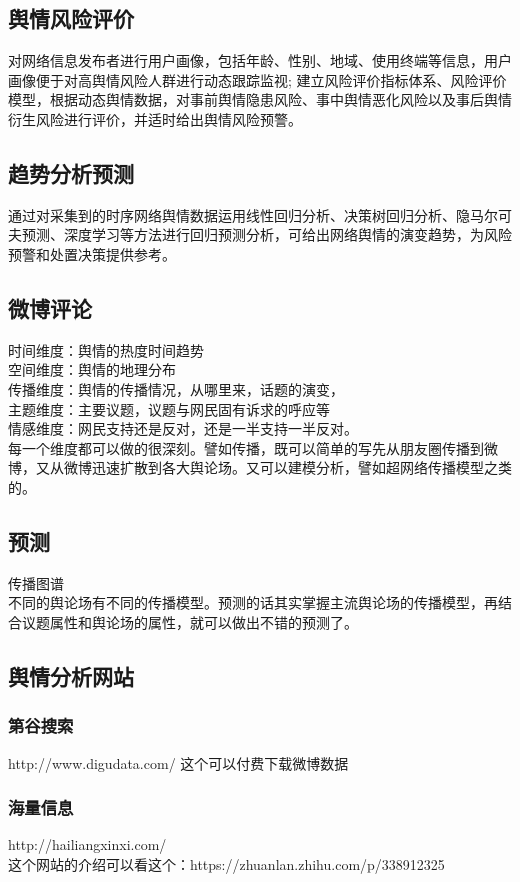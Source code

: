 \documentclass[11pt,a4paper,utf8]{article}
\begin{document}
\subsection{舆情风险评价}
对网络信息发布者进行用户画像，包括年龄、性别、地域、使用终端等信息，用户画像便于对高舆情风险人群进行动态跟踪监视; 建立风险评价指标体系、风险评价模型，根据动态舆情数据，对事前舆情隐患风险、事中舆情恶化风险以及事后舆情衍生风险进行评价，并适时给出舆情风险预警。

\subsection{趋势分析预测}
通过对采集到的时序网络舆情数据运用线性回归分析、决策树回归分析、隐马尔可夫预测、深度学习等方法进行回归预测分析，可给出网络舆情的演变趋势，为风险预警和处置决策提供参考。

\subsection{微博评论}
时间维度：舆情的热度时间趋势 \\ 
空间维度：舆情的地理分布 \\
传播维度：舆情的传播情况，从哪里来，话题的演变， \\
主题维度：主要议题，议题与网民固有诉求的呼应等 \\
情感维度：网民支持还是反对，还是一半支持一半反对。 \\
每一个维度都可以做的很深刻。譬如传播，既可以简单的写先从朋友圈传播到微博，又从微博迅速扩散到各大舆论场。又可以建模分析，譬如超网络传播模型之类的。

\subsection{预测}
传播图谱 \\ 
不同的舆论场有不同的传播模型。预测的话其实掌握主流舆论场的传播模型，再结合议题属性和舆论场的属性，就可以做出不错的预测了。

\subsection{舆情分析网站}
 
\subsubsection{第谷搜索}
http://www.digudata.com/ 这个可以付费下载微博数据

\subsubsection{海量信息}
http://hailiangxinxi.com/ \\ 
这个网站的介绍可以看这个：https://zhuanlan.zhihu.com/p/338912325
\end{document}
